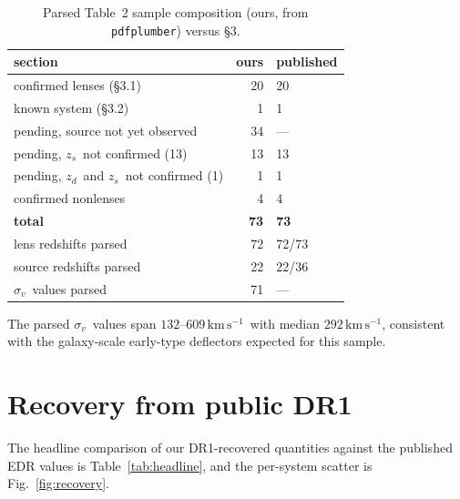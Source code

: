 \documentclass[11pt,letterpaper]{article}
\newcommand{\sigmav}{\ensuremath{\sigma_v}}
\newcommand{\zd}{\ensuremath{z_d}}
\newcommand{\zs}{\ensuremath{z_s}}
\newcommand{\kms}{\ensuremath{\mathrm{km\,s^{-1}}}}
\begin{document}
\begin{table}[ht]
\centering
\caption{Parsed Table~2 sample composition (ours, from \texttt{pdfplumber})
versus \citet{huang2025foundry2} \S3.}
\label{tab:sample}
\begin{tabular}{lrl}
\toprule
section                                   & ours & published \\
\midrule
confirmed lenses (\S3.1)                  & 20 & 20 \\
known system (\S3.2)                      &  1 &  1 \\
pending, source not yet observed          & 34 & --- \\
pending, \zs\ not confirmed (13)          & 13 & 13 \\
pending, \zd\ and \zs\ not confirmed (1)  &  1 &  1 \\
confirmed nonlenses                       &  4 &  4 \\
\midrule
\textbf{total}                            & \textbf{73} & \textbf{73} \\
\midrule
lens redshifts parsed                     & 72 & 72/73 \\
source redshifts parsed                   & 22 & 22/36 \\
\sigmav\ values parsed                    & 71 & --- \\
\bottomrule
\end{tabular}
\end{table}

The parsed \sigmav\ values span $132$--$609\,$\kms\ with median $292\,$\kms,
consistent with the galaxy-scale early-type deflectors expected for this
sample.

\section{Recovery from public DR1}

The headline comparison of our DR1-recovered quantities against the published
EDR values is Table~\ref{tab:headline}, and the per-system scatter is
Fig.~\ref{fig:recovery}.
\end{document}
